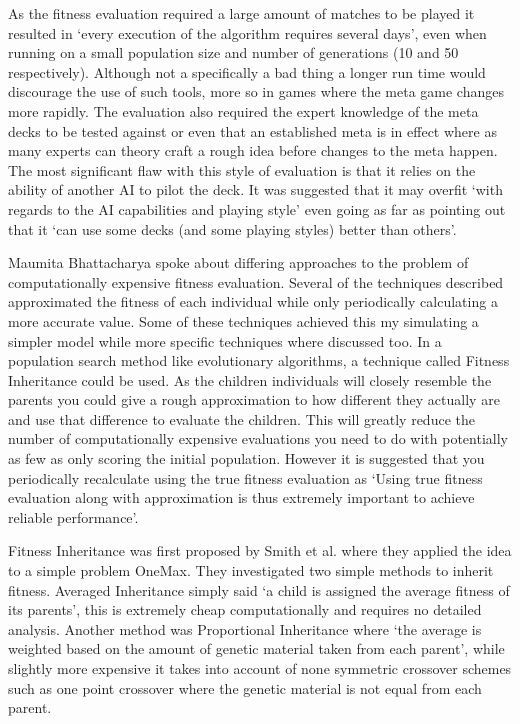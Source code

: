 \documentclass[a4paper]{article}
\begin{document}
As the fitness evaluation required a large amount of matches to be played it resulted in `every execution of the algorithm requires several days', even when running on a small population size and number of generations (10 and 50 respectively).
Although not a specifically a bad thing a longer run time would discourage the use of such tools, more so in games where the meta game changes more rapidly.
The evaluation also required the expert knowledge of the meta decks to be tested against or even that an established meta is in effect where as many experts can theory craft a rough idea before changes to the meta happen.
The most significant flaw with this style of evaluation is that it relies on the ability of another AI to pilot the deck.
It was suggested that it may overfit `with regards to the AI capabilities and playing style' even going as far as pointing out that it `can use some decks (and some playing styles) better than others'.
\\ \par
Maumita Bhattacharya spoke about differing approaches to the problem of computationally expensive fitness evaluation\cite{expensiveOptimisation}.
Several of the techniques described approximated the fitness of each individual while only periodically calculating a more accurate value.
Some of these techniques achieved this my simulating a simpler model while more specific techniques where discussed too.
In a population search method like evolutionary algorithms, a technique called Fitness Inheritance could be used.
As the children individuals will closely resemble the parents you could give a rough approximation to how different they actually are and use that difference to evaluate the children.
This will greatly reduce the number of computationally expensive evaluations you need to do with potentially as few as only scoring the initial population.
However it is suggested that you periodically recalculate using the true fitness evaluation as `Using true fitness evaluation along with approximation is thus extremely important to achieve reliable performance'.
\par
Fitness Inheritance was first proposed by Smith et al.\cite{fitnessInheritance} where they applied the idea to a simple problem OneMax.
They investigated two simple methods to inherit fitness.
Averaged Inheritance simply said `a child is assigned the average fitness of its parents', this is extremely cheap computationally and requires no detailed analysis.
Another method was Proportional Inheritance where `the average is weighted based on the amount of genetic material taken from each parent', while slightly more expensive it takes into account of none symmetric crossover schemes such as one point crossover where the genetic material is not equal from each parent.
\end{document}

